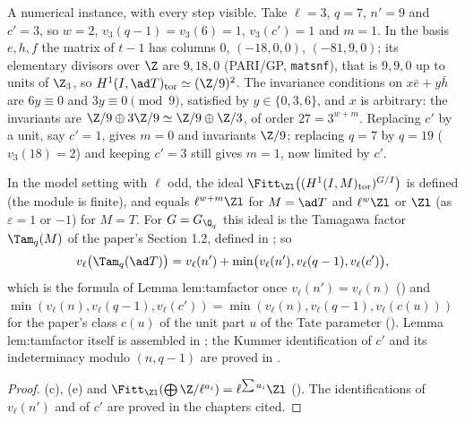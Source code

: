 A numerical instance, with every step visible. Take $\ell=3$, $q=7$, $n'=9$ and $c'=3$, so $w=2$, $v_3(q-1)=v_3(6)=1$, $v_3(c')=1$ and $m=1$. In the basis $e,h,f$ the
matrix of $t-1$ has columns $0$, $(-18,0,0)$, $(-81,9,0)$; its elementary divisors over $\Z$ are $9,18,0$ (PARI/GP, \texttt{matsnf}), that is $9,9,0$ up to units of $\Z_3$, so
$H^1(I,\ad T)_{\mathrm{tor}}\simeq(\Z/9)^2$. The invariance conditions on $x\bar e+y\bar h$ are $6y\equiv0$ and $3y\equiv0\pmod9$, satisfied by $y\in\{0,3,6\}$, and $x$
is arbitrary: the invariants are $\Z/9\oplus3\Z/9\simeq\Z/9\oplus\Z/3$, of order $27=3^{w+m}$. Replacing $c'$ by a unit, say $c'=1$, gives $m=0$ and invariants
$\Z/9$; replacing $q=7$ by $q=19$ ($v_3(18)=2$) and keeping $c'=3$ still gives $m=1$, now limited by $c'$.

\begin{corollary}\label{cor:cohomology:fitting}
In the model setting with $\ell$ odd, the ideal $\Fitt_{\Zl}\bigl((H^1(I,M)_{\mathrm{tor}})^{G/I}\bigr)$ is defined (the module is finite), and equals $\ell^{w+m}\Zl$ for $M=\ad T$ and
$\ell^w\Zl$ or $\Zl$ (as $\varepsilon=1$ or $-1$) for $M=T$. For $G=G_{\Q_q}$ this ideal is the Tamagawa factor $\Tam_q(M)$ of the paper's Section 1.2, defined in
; so
\[
v_\ell\bigl(\Tam_q(\ad T)\bigr)=v_\ell(n')+\min\bigl(v_\ell(n'),v_\ell(q-1),v_\ell(c')\bigr),
\]
which is the formula of Lemma lem:tamfactor once $v_\ell(n')=v_\ell(n)$ () and $\min(v_\ell(n),v_\ell(q-1),v_\ell(c'))=\min(v_\ell(n),v_\ell(q-1),v_\ell(c(u)))$ for the
paper's class $c(u)$ of the unit part $u$ of the Tate parameter (). Lemma lem:tamfactor itself is assembled in ; the Kummer
identification of $c'$ and its indeterminacy modulo $(n,q-1)$ are proved in .
\end{corollary}

\begin{proof}
(c), (e) and $\Fitt_{\Zl}(\bigoplus\Z/\ell^{a_i})=\ell^{\sum a_i}\Zl$ (). The identifications of $v_\ell(n')$ and of $c'$ are proved in the
chapters cited.
\end{proof}

